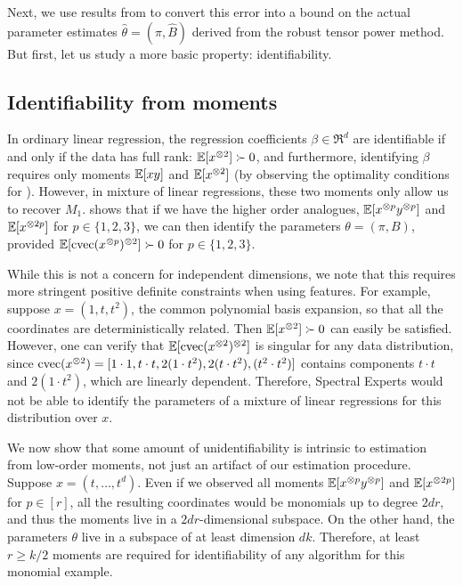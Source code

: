 Next, we use results from \citet{AnandkumarGeHsu2012} to convert this error
into a bound on the actual parameter estimates $\hat\theta = (\hat\pi, \hat B)$
derived from the robust tensor power method.
But first, let us study a more basic property: identifiability.


\subsection{Identifiability from moments}

In ordinary linear regression, the regression coefficients $\beta \in
\Re^d$ are identifiable if and only if the data has full rank:
$\operatorname{\mathbb{E}}[x^{\otimes 2}] \succ 0$, and furthermore, identifying $\beta$ requires
only moments $\operatorname{\mathbb{E}}[xy]$ and $\operatorname{\mathbb{E}}[x^{\otimes 2}]$ (by observing the optimality
conditions for ).  However, in mixture of linear regressions,
these two moments only allow us to recover $M_1$.  
shows that if we have the higher order analogues, $\operatorname{\mathbb{E}}[x^{\otimes p}y^{\otimes p}]$
and $\operatorname{\mathbb{E}}[x^{\otimes 2p}]$ for $p \in \{1,2,3\}$, we can then identify the
parameters $\theta = (\pi, B)$, provided $\operatorname{\mathbb{E}}[\operatorname{cvec}(x^{\otimes p})^{\otimes 2}] \succ
0$ for $p \in \{1,2,3\}$.

While this is not a concern for independent dimensions, we note that
this requires more stringent positive definite constraints when using
features. For example, suppose $x = (1, t, t^2)$, the common polynomial
basis expansion, so that all the coordinates are deterministically
related.  Then $\operatorname{\mathbb{E}}[x^{\otimes 2}] \succ 0$ can easily be satisfied. 
However, one can verify that $\operatorname{\mathbb{E}}[\operatorname{cvec}(x^{\otimes 2})^{\otimes 2}]$ is singular for
any data distribution, since $\operatorname{cvec}(x^{\otimes 2}) = [1 \cdot 1, t\cdot t, 2(1
\cdot t^2), 2(t \cdot t^2), (t^2 \cdot t^2)]$ contains components $t
\cdot t$ and $2(1 \cdot t^2)$, which are linearly dependent.  Therefore,
Spectral Experts would not be able to identify the parameters of
a mixture of linear regressions for this distribution over $x$.

We now show that some amount of unidentifiability is intrinsic to
estimation from low-order moments, not just an artifact of our
estimation procedure.  Suppose $x = (t, \dots, t^d)$.  Even if we
observed all moments $\operatorname{\mathbb{E}}[x^{\otimes p}y^{\otimes p}]$ and $\operatorname{\mathbb{E}}[x^{\otimes 2p}]$ for $p \in
[r]$, all the resulting coordinates would be monomials up to degree
$2dr$, and thus the moments live in a $2dr$-dimensional subspace.  On
the other hand, the parameters $\theta$ live in a subspace of at least
dimension $dk$.  Therefore, at least $r \ge k/2$ moments are required
for identifiability of any algorithm for this monomial example.

